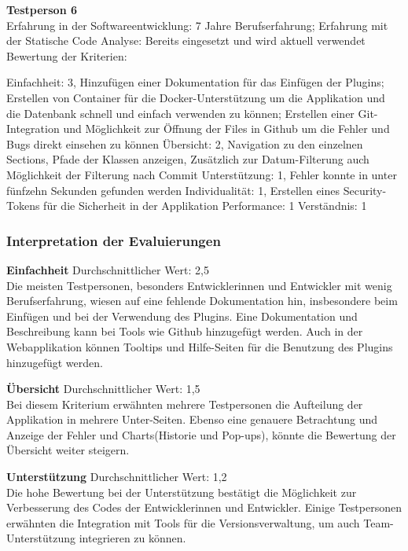 \textbf{Testperson 6} \\
Erfahrung in der Softwareentwicklung: 7 Jahre Berufserfahrung; Erfahrung mit der Statische Code Analyse: Bereits eingesetzt und wird aktuell verwendet\\
Bewertung der Kriterien:

Einfachheit: 3, Hinzufügen einer Dokumentation für das Einfügen der Plugins; Erstellen von Container für die Docker-Unterstützung um die Applikation und die Datenbank schnell und einfach verwenden zu können; Erstellen einer Git-Integration und Möglichkeit zur Öffnung der Files in Github um die Fehler und Bugs direkt einsehen zu können \newline Übersicht: 2, Navigation zu den einzelnen Sections, Pfade der Klassen anzeigen, Zusätzlich zur Datum-Filterung auch Möglichkeit der Filterung nach Commit \newline  Unterstützung: 1, Fehler konnte in unter fünfzehn Sekunden gefunden werden \newline Individualität: 1, Erstellen eines Security-Tokens für die Sicherheit in der Applikation \newline Performance: 1 \newline  Verständnis: 1\newline 

\subsubsection{Interpretation der Evaluierungen}
\textbf{Einfachheit}
Durchschnittlicher Wert: 2,5\\
Die meisten Testpersonen, besonders Entwicklerinnen und Entwickler mit wenig Berufserfahrung, wiesen auf eine fehlende Dokumentation hin, insbesondere beim Einfügen und bei der Verwendung des Plugins. Eine Dokumentation und Beschreibung kann bei Tools wie Github hinzugefügt werden. Auch in der Webapplikation können Tooltips und Hilfe-Seiten für die Benutzung des Plugins hinzugefügt werden.

\textbf{Übersicht}
Durchschnittlicher Wert: 1,5\\
Bei diesem Kriterium erwähnten mehrere Testpersonen die Aufteilung der Applikation in mehrere Unter-Seiten. Ebenso eine genauere Betrachtung und Anzeige der Fehler und Charts(Historie und Pop-ups), könnte die Bewertung der Übersicht weiter steigern.

\textbf{Unterstützung}
Durchschnittlicher Wert: 1,2\\
Die hohe Bewertung bei der Unterstützung bestätigt die Möglichkeit zur Verbesserung des Codes der Entwicklerinnen und Entwickler. Einige Testpersonen erwähnten die Integration mit Tools für die Versionsverwaltung, um auch Team-Unterstützung integrieren zu können.

